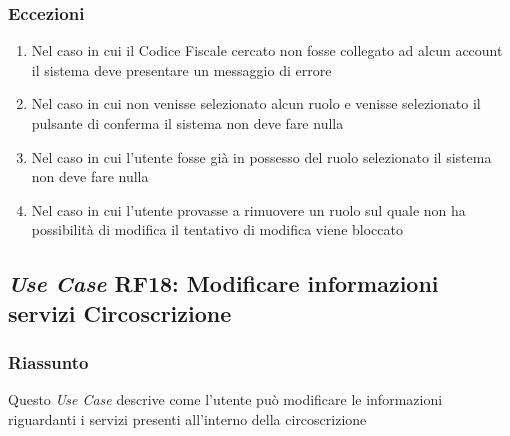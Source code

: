         \subsubsection{Eccezioni}
            \begin{enumerate}
                \item Nel caso in cui il Codice Fiscale cercato non fosse collegato ad alcun account il sistema deve presentare un messaggio di errore
                \item Nel caso in cui non venisse selezionato alcun ruolo e venisse selezionato il pulsante di conferma il sistema non deve fare nulla
                \item Nel caso in cui l'utente fosse già in possesso del ruolo selezionato il sistema non deve fare nulla
                \item Nel caso in cui l'utente provasse a rimuovere un ruolo sul quale non ha possibilità di modifica il tentativo di modifica viene bloccato
            \end{enumerate}

    \subsection{\textit{Use Case} RF18: Modificare informazioni servizi Circoscrizione}
        \subsubsection{Riassunto}
        Questo \textit{Use Case} descrive come l'utente può modificare le informazioni riguardanti i servizi presenti all'interno della circoscrizione
